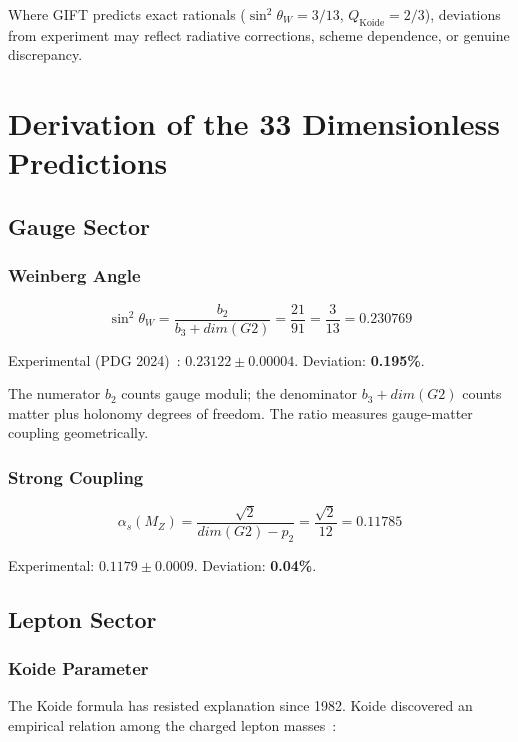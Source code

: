 \documentclass[11pt,a4paper]{article}
\newcommand{\Gtwo}{\mathrm{G}_2}
\newcommand{\dimE}{\mathrm{dim}}
\def\Gtwo{G2}%
\def\dimE{dim}%
\begin{document}
Where GIFT predicts exact rationals ($\sin^2\theta_W = 3/13$, $Q_{\mathrm{Koide}} = 2/3$), deviations from experiment may reflect radiative corrections, scheme dependence, or genuine discrepancy.

\section{Derivation of the 33 Dimensionless Predictions}

\subsection{Gauge Sector}

\subsubsection{Weinberg Angle}

$$\sin^2\theta_W = \frac{b_2}{b_3 + \dimE(\Gtwo)} = \frac{21}{91} = \frac{3}{13} = 0.230769$$

Experimental (PDG 2024)~\cite{pdg2024}: $0.23122 \pm 0.00004$. Deviation: \textbf{0.195\%}.

The numerator $b_2$ counts gauge moduli; the denominator $b_3 + \dimE(\Gtwo)$ counts matter plus holonomy degrees of freedom. The ratio measures gauge-matter coupling geometrically.

\subsubsection{Strong Coupling}

$$\alpha_s(M_Z) = \frac{\sqrt{2}}{\dimE(\Gtwo) - p_2} = \frac{\sqrt{2}}{12} = 0.11785$$

Experimental: $0.1179 \pm 0.0009$. Deviation: \textbf{0.04\%}.

\subsection{Lepton Sector}

\subsubsection{Koide Parameter}

The Koide formula has resisted explanation since 1982. Koide discovered an empirical relation among the charged lepton masses~\cite{koide1982}:
\end{document}
